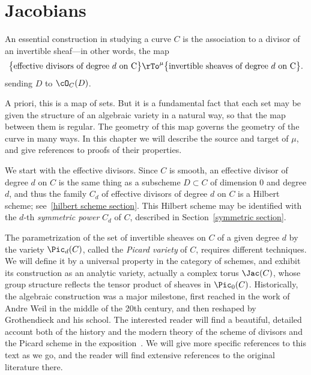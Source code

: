

\chapter{Jacobians}\label{Jacobians chapter}\label{new Jacobians chapter}\label{JacobianChapter}


An essential construction in studying a curve $C$ is the association to a divisor  of an invertible sheaf---in other words, the map
$$
\big\{ \text{effective divisors of degree $d$ on C}\big\} \rTo^\mu \big\{ \text{invertible sheaves of degree $d$ on C} \big\}.
$$
sending $D$ to $\cO_C(D)$.

A priori, this is a map of sets. But it is a fundamental fact that each set may  be given the structure of an algebraic variety in a natural way, so that the map between them is regular. The geometry of this map governs the geometry of the curve in many ways.
In this chapter we will describe the source and target of $\mu$, and give references to proofs of their properties. 

We start with the effective divisors. Since $C$ is smooth, an effective divisor of degree $d$ on $C$ is the same thing as a subscheme $D \subset C$ of dimension 0 and degree $d$, and thus
the family $C_d$ of effective divisors of degree $d$ on $C$ is a Hilbert scheme; see~\ref{hilbert scheme section}. This Hilbert scheme may be identified with
the $d$-th \emph{symmetric power} $C_d$  of $C$, described in Section~\ref{symmetric section}. 

The parametrization of the set of invertible sheaves on $C$ of a given degree $d$ by the variety $\Pic_d(C)$, called the \emph{Picard variety} of $C$, requires different techniques. We will define it by a universal property in the category of schemes, and exhibit its construction as an analytic variety, actually a complex torus $\Jac(C)$, whose group structure reflects the tensor product of
sheaves in $\Pic_0(C)$.
Historically, the algebraic construction was a major milestone, first reached in the work of Andre Weil in the middle of
the 20th century, and then reshaped by Grothendieck and his school. The interested reader will find a beautiful, detailed account both of the history and the 
modern theory of the scheme of divisors and the Picard scheme in the exposition~\cite{Kleiman-PicardScheme}. We will give
more specific references to this text as we go, and the reader will find extensive references to the original literature there.

